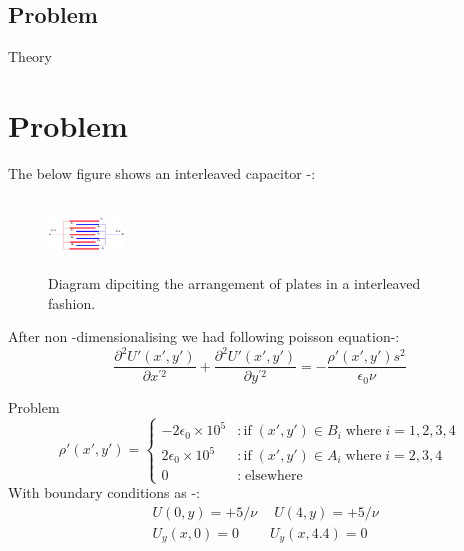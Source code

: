 \documentclass[9 pt]{beamer}
\begin{document}
	\subsection{Problem}
	\begin{frame}{Theory}
		\section{Problem}
		The below figure shows an interleaved capacitor -:
			\begin{figure}[h]
			\centering
			\includegraphics[width=2cm, height=1.9cm]{insert.png}
			\caption{\small Diagram dipciting the arrangement of plates in a interleaved fashion.}
			\label{fig 1: the capacitor}

			\end{figure}
			After non -dimensionalising we had following poisson equation-:
			$$ \frac{\partial^2U'(x',y') }{\partial x^{'2}} + \frac{\partial^2U'(x',y') }{\partial y^{'2}}= -\frac{\rho'(x',y') s^2}{\epsilon_0 \nu} $$
			
		\end{frame}
	\begin{frame}{Problem}
		\begin{equation}
			\rho'(x',y') =  \begin{cases}
				-2\epsilon_0 \times 10^5  & :\text{if} \; (x',y') \in B_i \; \text{where} \; i = 1,2,3,4 \\
				2\epsilon_0 \times 10^5 & :\text{if} \; (x',y') \in A_i \; \text{where} \; i = 2,3,4 \\
				0  & : \; \text{elsewhere}
			\end{cases}
		\end{equation}
		With boundary conditions as -:
		\begin{align}
			& U(0,y) = +5/\nu \quad \ U(4,y) = +5/\nu \\ 
			& U_y(x,0) = 0 \qquad \ U_y(x,4.4) = 0 
		\end{align}
		
		\end{frame}	
\end{document}
